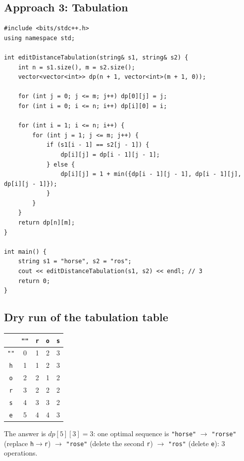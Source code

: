 \subsection*{Approach 3: Tabulation}

\begin{lstlisting}
#include <bits/stdc++.h>
using namespace std;

int editDistanceTabulation(string& s1, string& s2) {
    int n = s1.size(), m = s2.size();
    vector<vector<int>> dp(n + 1, vector<int>(m + 1, 0));

    for (int j = 0; j <= m; j++) dp[0][j] = j;
    for (int i = 0; i <= n; i++) dp[i][0] = i;

    for (int i = 1; i <= n; i++) {
        for (int j = 1; j <= m; j++) {
            if (s1[i - 1] == s2[j - 1]) {
                dp[i][j] = dp[i - 1][j - 1];
            } else {
                dp[i][j] = 1 + min({dp[i - 1][j - 1], dp[i - 1][j], dp[i][j - 1]});
            }
        }
    }
    return dp[n][m];
}

int main() {
    string s1 = "horse", s2 = "ros";
    cout << editDistanceTabulation(s1, s2) << endl; // 3
    return 0;
}
\end{lstlisting}

\subsection*{Dry run of the tabulation table}


\begin{center}
\begin{tabular}{c|c|c|c|c}
 & \texttt{""} & \texttt{r} & \texttt{o} & \texttt{s} \\ \hline
\texttt{""} & 0 & 1 & 2 & 3 \\ \hline
\texttt{h} & 1 & 1 & 2 & 3 \\ \hline
\texttt{o} & 2 & 2 & 1 & 2 \\ \hline
\texttt{r} & 3 & 2 & 2 & 2 \\ \hline
\texttt{s} & 4 & 3 & 3 & 2 \\ \hline
\texttt{e} & 5 & 4 & 4 & 3
\end{tabular}
\end{center}

The answer is $\textit{dp}[5][3]=3$: one optimal sequence is
\texttt{"horse"} $\to$ \texttt{"rorse"} (replace \texttt{h}$\to$\texttt{r})
$\to$ \texttt{"rose"} (delete the second \texttt{r}) $\to$
\texttt{"ros"} (delete \texttt{e}): $3$ operations.

